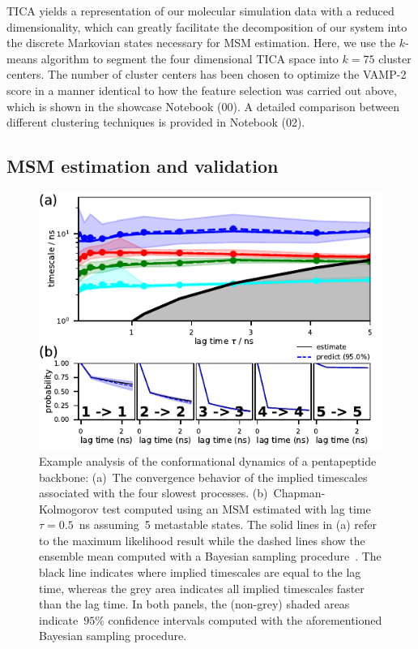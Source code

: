 \documentclass[9pt,tutorial]{livecoms}
\begin{document}
TICA yields a representation of our molecular simulation data with a reduced dimensionality,
which can greatly facilitate the decomposition of our system into the discrete Markovian states necessary for MSM estimation.
Here, we use the $k$-means algorithm to segment the four dimensional TICA space into $k=75$ cluster centers.
The number of cluster centers has been chosen to optimize the VAMP-2 score in a manner identical to how the feature selection was carried out above,
which is shown in the showcase Notebook (00).
A detailed comparison between different clustering techniques is provided in Notebook (02).

\subsection{MSM estimation and validation}

\begin{figure}
\includegraphics{figure_4}
\caption{Example analysis of the conformational dynamics of a pentapeptide backbone:
(a)~The convergence behavior of the implied timescales associated with the four slowest processes.
(b)~Chapman-Kolmogorov test computed using an MSM estimated with lag time $\tau=0.5$~ns assuming~5 metastable states.
The solid lines in (a) refer to the maximum likelihood result while the dashed lines show the ensemble mean computed with a Bayesian sampling procedure~\cite{ben-rev-msm}.
The black line indicates where implied timescales are equal to the lag time,
whereas the grey area indicates all implied timescales faster than the lag time.
In both panels, the (non-grey) shaded areas indicate~$95\%$ confidence intervals computed with the aforementioned Bayesian sampling procedure.}
\label{fig:its-and-ck}
\end{figure}
\end{document}
